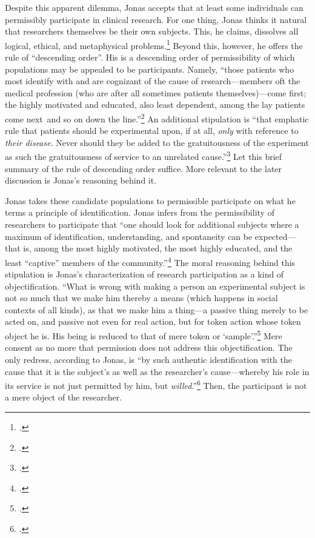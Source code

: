\documentclass[letterpaper,notitlepage,12pt]{article}
\begin{document}
Despite this apparent dilemma, Jonas accepts that at least some individuals can permissibly participate in clinical research.
For one thing, Jonas thinks it natural that researchers themselves be their own subjects.
This, he claims, dissolves all logical, ethical, and metaphysical problems.\footcite[p. 234]{jonas_philosophical_1969}
Beyond this, however, he offers the rule of ``descending order''.
His is a descending order of permissibility of which populations may be appealed to be participants.
Namely, ``those patients who most identify with and are cognizant of the cause of research---members oft the medical profession (who are after all sometimes patients themselves)---come first; the highly motivated and educated, also least dependent, among the lay patients come next\ and so on down the line.''\footcite[p. 239--40]{jonas_philosophical_1969}
An additional stipulation is ``that emphatic rule that patients should be experimental upon, if at all, \textit{only} with reference to \textit{their disease}. Never should they be added to the gratuitousness of the experiment as such the gratuitousness of service to an unrelated cause.''\footcite[p. 241]{jonas_philosophical_1969}
Let this brief summary of the rule of descending order suffice.
More relevant to the later discussion is Jonas's reasoning behind it.

Jonas takes these candidate populations to permissible participate on what he terms a principle of identification.
Jonas infers from the permissibility of researchers to participate that ``one should look for additional subjects where a maximum of identification, understanding, and spontaneity can be expected---that is, among the most highly motivated, the most highly educated, and the least ``captive'' members of the community.''\footcite[p. 235]{jonas_philosophical_1969}
The moral reasoning behind this stipulation is Jonas's characterization of research participation as a kind of objectification.
``What is wrong with making a person an experimental subject is not so much that we make him thereby a means (which happens in social contexts of all kinds), as that we make him a thing---a passive thing merely to be acted on, and passive not even for real action, but for token action whose token object he is. His being is reduced to that of mere token or `sample'.''\footcite[p. 235]{jonas_philosophical_1969}
Mere consent as no more that permission does not address this objectification.
The only redress, according to Jonas, is ``by such authentic identification with the cause that it is the subject's as well as the researcher's cause---whereby his role in its service is not just permitted by him, but \textit{willed}.''\footcite[p. 236]{jonas_philosophical_1969}
Then, the participant is not a mere object of the researcher.
\end{document}
